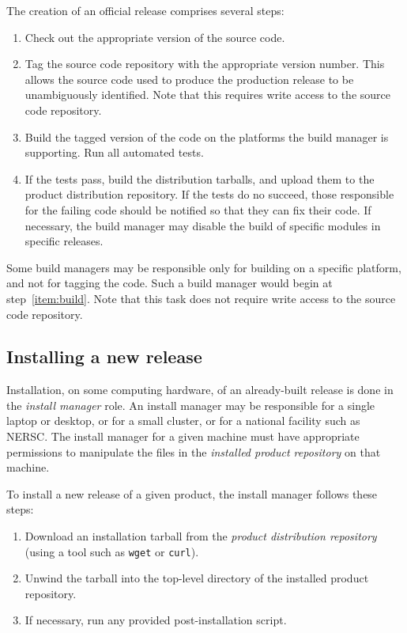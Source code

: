 \documentclass[draftmode,draftwater]{memarticle}
\newcommand{\prog}[1]%
  {\texttt{#1}}
\begin{document}
The creation of an official release comprises several steps:
\begin{enumerate}
\item Check out the appropriate version of the source code.
\item Tag the source code repository with the appropriate version
  number. This allows the source code used to produce the production
  release to be unambiguously identified. Note that this requires write
  access to the source code repository.
\item \label{item:build} Build the tagged version of the code on the
  platforms the build manager is supporting. Run all automated tests.
\item If the tests pass, build the distribution tarballs, and upload
  them to the product distribution repository. If the tests do no
  succeed, those responsible for the failing code should be notified so
  that they can fix their code. If necessary, the build manager may
  disable the build of specific modules in specific releases.
\end{enumerate}

Some build managers may be responsible only for building on a specific
platform, and not for tagging the code. Such a build manager would begin
at step~\ref{item:build}. Note that this task does not require write
access to the source code repository.

\subsection{Installing a new release}

Installation, on some computing hardware, of an already-built release is
done in the \emph{install manager} role. An install manager may be
responsible for a single laptop or desktop, or for a small cluster, or
for a national facility such as NERSC. The install manager for a given
machine must have appropriate permissions to manipulate the files in the
\emph{installed product repository} on that machine.

To install a new release of a given product, the install manager follows
these steps:
\begin{enumerate}
\item Download an installation tarball from the \emph{product distribution
  repository} (using a tool such as \prog{wget} or \prog{curl}).
\item Unwind the tarball into the top-level directory of the installed
  product repository.
\item If necessary, run any provided post-installation script.
\end{enumerate}
\end{document}
